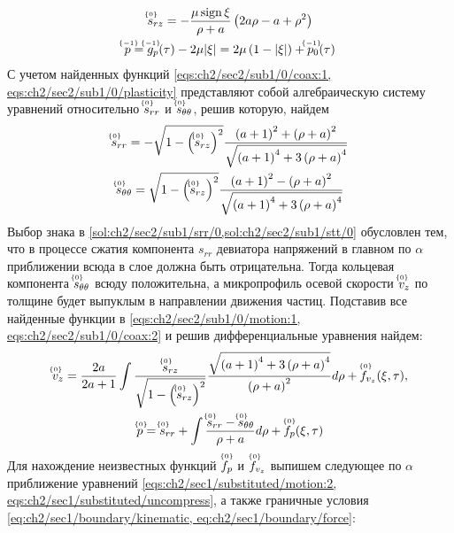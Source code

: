 \begin{gather}
  \label{sol:ch2/sec2/sub1/srz/0}
  \uindex{s}{0}_{rz} = -\frac{\mu\sign\xi}{\rho+a}\left(2a\rho-a+\rho^2\right)
  \\
  \label{sol:ch2/sec2/sub1/p/-1}
  \uindex{p}{-1} = \uindex{g}{-1}_{p}(\tau) -2\mu\lvert\xi\rvert = 2\mu\left(1-\lvert\xi\rvert\right) + \uindex{p}{-1}_{0}(\tau)
\end{gather}
С учетом найденных функций \cref{eqs:ch2/sec2/sub1/0/coax:1, eqs:ch2/sec2/sub1/0/plasticity} представляют собой алгебраическую систему уравнений относительно $\uindex{s}{0}_{rr}$ и $\uindex{s}{0}_{\theta\theta}$, решив которую, найдем
\begin{gather}
  \label{sol:ch2/sec2/sub1/srr/0}
  \uindex{s}{0}_{rr} = -\sqrt{1-\left(\uindex{s}{0}_{rz}\right)^2}\frac{\left(a+1\right)^2+\left(\rho+a\right)^2}{\sqrt{\left(a+1\right)^4+3\left(\rho+a\right)^4}}
  \\
  \label{sol:ch2/sec2/sub1/stt/0}
  \uindex{s}{0}_{\theta\theta} = \sqrt{1-\left(\uindex{s}{0}_{rz}\right)^2}\frac{\left(a+1\right)^2-\left(\rho+a\right)^2}{\sqrt{\left(a+1\right)^4+3\left(\rho+a\right)^4}}
\end{gather}
Выбор знака в \cref{sol:ch2/sec2/sub1/srr/0,sol:ch2/sec2/sub1/stt/0} обусловлен тем, что в процессе сжатия компонента $s_{rr}$ девиатора напряжений в главном по $\alpha$ приближении всюда в слое должна быть отрицательна. Тогда кольцевая компонента $\uindex{s}{0}_{\theta\theta}$ всюду положительна, а микропрофиль осевой скорости $\uindex{v}{0}_{z}$ по толщине будет выпуклым в направлении движения частиц. Подставив все найденные функции в \cref{eqs:ch2/sec2/sub1/0/motion:1, eqs:ch2/sec2/sub1/0/coax:2} и решив дифференциальные уравнения найдем:
\begin{gather}
  \label{sol:ch2/sec2/sub1/vz/0}
  \uindex{v}{0}_{z} = \frac{2a}{2a+1}\int{\frac{\uindex{s}{0}_{rz}}{\sqrt{1-\left(\uindex{s}{0}_{rz}\right)^2}}}\frac{\sqrt{\left(a+1\right)^4+3\left(\rho+a\right)^4}}{\left(\rho+a\right)^2}d\rho + \uindex{f}{0}_{v_{z}}(\xi,\tau),
  \\
  \label{sol:ch2/sec2/sub1/p/0}
  \uindex{p}{0} = \uindex{s}{0}_{rr} + \int{\frac{\uindex{s}{0}_{rr}-\uindex{s}{0}_{\theta\theta}}{\rho+a}d\rho}+\uindex{f}{0}_{p}(\xi,\tau)
\end{gather}
Для нахождение неизвестных функций $\uindex{f}{0}_{p}$ и $\uindex{f}{0}_{v_{z}}$ выпишем следующее по $\alpha$ приближение уравнений \cref{eqs:ch2/sec1/substituted/motion:2, eqs:ch2/sec1/substituted/uncompress}, а также граничные условия \cref{eq:ch2/sec1/boundary/kinematic, eq:ch2/sec1/boundary/force}:
